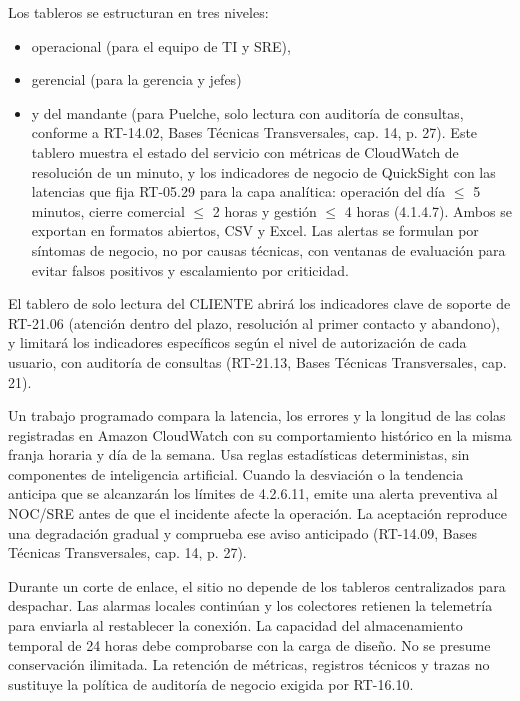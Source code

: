 Los tableros se estructuran en tres niveles:

\begin{itemize}
  \item operacional (para el equipo de TI y SRE),
  \item gerencial (para la gerencia y jefes)
  \item y del mandante (para Puelche, solo lectura con auditoría de consultas, conforme a RT-14.02, Bases Técnicas Transversales, cap. 14, p. 27). Este tablero muestra el estado del servicio con métricas de CloudWatch de resolución de un minuto, y los indicadores de negocio de QuickSight con las latencias que fija RT-05.29 para la capa analítica: operación del día $\leq$ 5 minutos, cierre comercial $\leq$ 2 horas y gestión $\leq$ 4 horas (4.1.4.7). Ambos se exportan en formatos abiertos, CSV y Excel. Las alertas se formulan por síntomas de negocio, no por causas técnicas, con ventanas de evaluación para evitar falsos positivos y escalamiento por criticidad.
\end{itemize}

El tablero de solo lectura del CLIENTE abrirá los indicadores clave de soporte de RT-21.06 (atención dentro del plazo, resolución al primer contacto y abandono), y limitará los indicadores específicos según el nivel de autorización de cada usuario, con auditoría de consultas (RT-21.13, Bases Técnicas Transversales, cap. 21).

Un trabajo programado compara la latencia, los errores y la longitud de las colas registradas en Amazon CloudWatch con su comportamiento histórico en la misma franja horaria y día de la semana. Usa reglas estadísticas deterministas, sin componentes de inteligencia artificial. Cuando la desviación o la tendencia anticipa que se alcanzarán los límites de 4.2.6.11, emite una alerta preventiva al NOC/SRE antes de que el incidente afecte la operación. La aceptación reproduce una degradación gradual y comprueba ese aviso anticipado (RT-14.09, Bases Técnicas Transversales, cap. 14, p. 27).

Durante un corte de enlace, el sitio no depende de los tableros centralizados para despachar. Las alarmas locales continúan y los colectores retienen la telemetría para enviarla al restablecer la conexión. La capacidad del almacenamiento temporal de 24 horas debe comprobarse con la carga de diseño. No se presume conservación ilimitada. La retención de métricas, registros técnicos y trazas no sustituye la política de auditoría de negocio exigida por RT-16.10.

